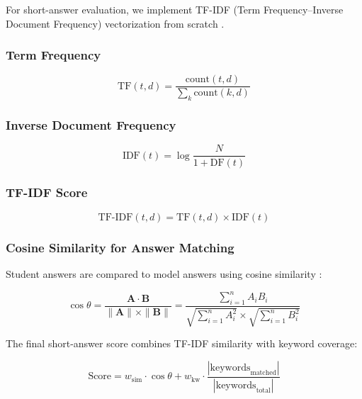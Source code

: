 \documentclass{article}
\begin{document}
For short-answer evaluation, we implement TF-IDF (Term Frequency--Inverse Document Frequency) vectorization from scratch \cite{tfidf_original}.

\subsubsection{Term Frequency}

\begin{equation}
    \text{TF}(t, d) = \frac{\text{count}(t, d)}{\sum_{k} \text{count}(k, d)}
    \label{eq:tf}
\end{equation}

\subsubsection{Inverse Document Frequency}

\begin{equation}
    \text{IDF}(t) = \log \frac{N}{1 + \text{DF}(t)}
    \label{eq:idf}
\end{equation}

\subsubsection{TF-IDF Score}

\begin{equation}
    \text{TF-IDF}(t, d) = \text{TF}(t, d) \times \text{IDF}(t)
    \label{eq:tfidf}
\end{equation}

\subsubsection{Cosine Similarity for Answer Matching}

Student answers are compared to model answers using cosine similarity \cite{cosine_similarity}:

\begin{equation}
    \cos\theta = \frac{\mathbf{A} \cdot \mathbf{B}}{\|\mathbf{A}\| \times \|\mathbf{B}\|} = \frac{\sum_{i=1}^{n} A_i B_i}{\sqrt{\sum_{i=1}^{n} A_i^2} \times \sqrt{\sum_{i=1}^{n} B_i^2}}
    \label{eq:cosine}
\end{equation}

The final short-answer score combines TF-IDF similarity with keyword coverage:

\begin{equation}
    \text{Score} = w_{\text{sim}} \cdot \cos\theta + w_{\text{kw}} \cdot \frac{|\text{keywords}_{\text{matched}}|}{|\text{keywords}_{\text{total}}|}
    \label{eq:short_answer_score}
\end{equation}
\end{document}
